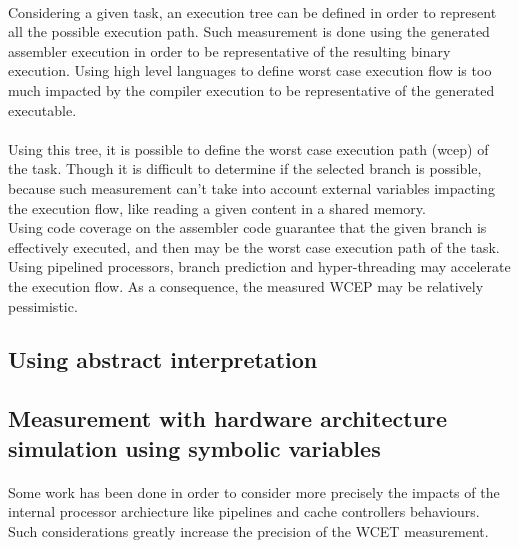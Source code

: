 \paragraph{}
Considering a given task, an execution tree can be defined in order to represent all the possible
execution path. Such measurement is done using the generated assembler execution in order to be
representative of the resulting binary execution. Using high level languages to define worst case
execution flow is too much impacted by the compiler execution to be representative of the generated
executable.

\paragraph{}
Using this tree, it is possible to define the worst case execution path (\gls{wcep}) of the task.
Though it is difficult to determine if the selected branch is possible, because such measurement
can't take into account external variables impacting the execution flow, like reading a given
content in a shared memory.\\
Using code coverage on the assembler code guarantee that the given branch is effectively executed,
and then may be the worst case execution path of the task.\\
Using pipelined processors, branch prediction and hyper-threading may accelerate the execution flow.
As a consequence, the measured WCEP may be relatively pessimistic.

\subsection{Using abstract interpretation}

\subsection{Measurement with hardware architecture simulation using symbolic variables}

\paragraph{}
Some work has been done  in order to consider more precisely the impacts
of the internal processor archiecture like pipelines and cache controllers behaviours.\\
Such considerations greatly increase the precision of the WCET measurement.


